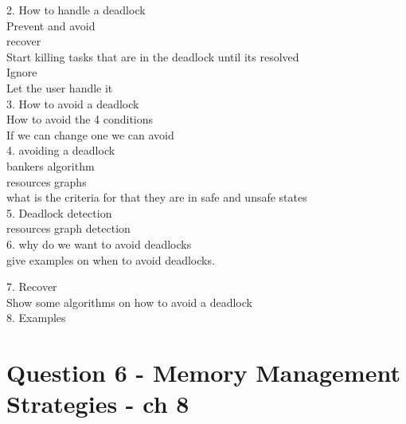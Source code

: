 \documentclass[a4paper,10pt,titlepage]{report}
\begin{document}
2.  How to handle a deadlock \\
\hspace{10mm} Prevent and avoid \\
\hspace{10mm} recover \\
\hspace{15mm} Start killing tasks that are in the deadlock until its resolved \\
\hspace{10mm} Ignore \\
\hspace{15mm} Let the user handle it \\


3. How to avoid a deadlock \\
\hspace{10mm} How to avoid the 4 conditions \\
\hspace{15mm} If we can change one we can avoid \\


4. avoiding a deadlock \\
\hspace{10mm} bankers algorithm \\
\hspace{10mm} resources graphs \\
\hspace{10mm} what is the criteria for that they are in safe and unsafe states \\

5. Deadlock detection  \\
\hspace{10mm} resources graph detection \\


6. why do we want to avoid deadlocks\\
\hspace{10mm} give examples on when to avoid deadlocks.

7. Recover \\
\hspace{10mm} Show some algorithms on how to avoid a deadlock \\

8. Examples \\
%



\newpage
\section{Question 6 - Memory Management Strategies - ch 8}
\end{document}
